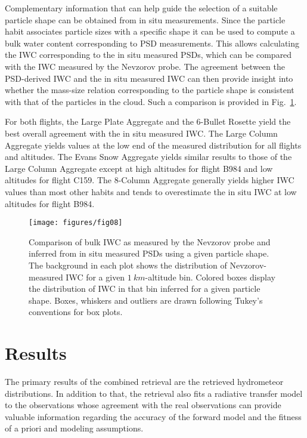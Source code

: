 \documentclass[journal abbreviation, manuscript]{copernicus}
\providecommand{\DIFadd}[1]{{\protect\color{blue}\uwave{#1}}} %
\providecommand{\DIFaddbegin}{} %
\providecommand{\DIFaddend}{} %
\begin{document}
Complementary information that can help guide the selection of a suitable
particle shape can be obtained from in situ measurements. Since the particle
habit associates particle sizes with a specific shape it can be used to compute
a bulk water content corresponding to PSD measurements. This allows calculating
the IWC corresponding to the in situ measured PSDs, which can be compared with
the IWC measured by the Nevzorov probe. The agreement between the PSD-derived
IWC and the in situ measured IWC can then provide insight into whether the
mass-size relation corresponding to the particle shape is consistent with
that of the particles in the cloud. Such a comparison is provided in
Fig.~\ref{fig:mass_size_relation}.

For both flights, the Large Plate Aggregate and the 6-Bullet Rosette yield
the best overall agreement with the in situ measured IWC. The Large Column
Aggregate yields values at the low end of the measured distribution for all
flights and altitudes. The Evans Snow Aggregate yields similar results to those
of the Large Column Aggregate except at high altitudes for flight B984 and low
altitudes for flight C159. The 8-Column Aggregate generally yields higher IWC
values than most other habits and tends to overestimate the in situ IWC at low
altitudes for flight B984.

\begin{figure}
  \centering
  \texttt{[image: figures/fig08]}
  \caption{ Comparison of bulk IWC as measured by the Nevzorov probe and
    inferred from in situ measured PSDs using a given particle shape. The
    background in each plot shows the distribution of Nevzorov-measured IWC for
    a given $1\ \unit{km}$-altitude bin. Colored boxes display the distribution
    of IWC in that bin inferred for a given particle shape. Boxes, whiskers and
    outliers are drawn following Tukey's conventions for box plots.}
  \label{fig:mass_size_relation}
\end{figure}


\section{Results}
\label{sec:results}

The primary results of the combined retrieval are the retrieved hydrometeor \DIFaddbegin \DIFadd{size
}\DIFaddend distributions. In addition to that, the retrieval also fits a radiative transfer
model to the observations whose agreement with the real observations can provide
valuable information regarding the accuracy of the forward model and the fitness
of a priori and modeling assumptions.
\end{document}
